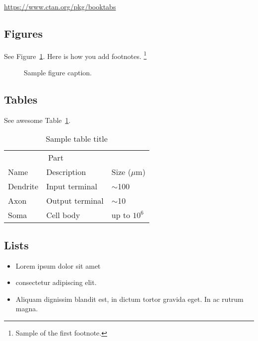 \documentclass{article}
\begin{document}
  \begin{center}
    \url{https://www.ctan.org/pkg/booktabs}
  \end{center}

  \subsection{Figures}
  \label{subsec:figures}
  \lipsum[10]
  See Figure~\ref{fig:fig1}. Here is how you add footnotes. \footnote{Sample of the first footnote.}
  \lipsum[11]

  \begin{figure}
    \centering
    \fbox{\rule[-.5cm]{4cm}{4cm} \rule[-.5cm]{4cm}{0cm}}
    \caption{Sample figure caption.}
    \label{fig:fig1}
  \end{figure}

  \subsection{Tables}
  \label{subsec:tables}
  \lipsum[12]
  See awesome Table~\ref{tab:table}.

  \begin{table}
    \caption{Sample table title}
    \centering
    \begin{tabular}{lll}
      \toprule
      \multicolumn{2}{c}{Part} \\
      \cmidrule(r){1-2}
      Name     & Description     & Size ($\mu$m) \\
      \midrule
      Dendrite & Input terminal  & $\sim$100     \\
      Axon     & Output terminal & $\sim$10      \\
      Soma     & Cell body       & up to $10^6$  \\
      \bottomrule
    \end{tabular}
    \label{tab:table}
  \end{table}

  \subsection{Lists}
  \label{subsec:lists}
  \begin{itemize}
    \item Lorem ipsum dolor sit amet
    \item consectetur adipiscing elit.
    \item Aliquam dignissim blandit est, in dictum tortor gravida eget. In ac rutrum magna.
  \end{itemize}
\end{document}
